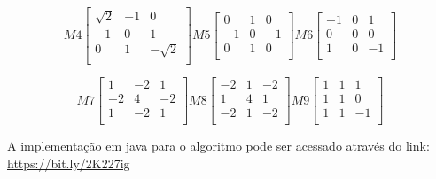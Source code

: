 \documentclass[
	12pt,				%
	oneside,			%
	a4paper,			%
	english,			%
	french,				%
	spanish,			%
	brazil,				%
	]{abntex2}
\begin{document}
\[
M4
\begin{bmatrix}
      \sqrt{2} &            -1 &  0         \\
	        -1 &             0 & 1          \\
	         0 &             1 & -\sqrt{2}  \\
\end{bmatrix} 
M5
\begin{bmatrix}
    	 	 0 &             1 &  0          \\ 
	        -1 &             0 & -1          \\ 
	         0 &             1 &  0          \\ 
\end{bmatrix}
M6
\begin{bmatrix}
  	 	 	-1 &             0 &  1          \\ 
             0 &             0 &  0          \\ 
             1 &             0 & -1          \\ 
\end{bmatrix} 
\]

\[
M7
\begin{bmatrix}
            1 &            -2 &  1           \\ 
	       -2 &             4 & -2           \\ 
	        1 &            -2 &  1           \\ 
\end{bmatrix} 
M8
\begin{bmatrix}
           -2 &             1 & -2            \\
	        1 &             4 &  1            \\
	       -2 &             1 & -2            \\
\end{bmatrix}
M9
\begin{bmatrix}
     	 	 1 &             1 &  1           \\
	         1 &             1 &  0           \\
	         1 &             1 & -1           \\
\end{bmatrix} 
\]

A implementação em java para o algoritmo pode ser acessado através do link: \url{https://bit.ly/2K227ig}
\end{document}
